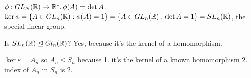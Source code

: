 \documentclass[class=article,crop=false]{standalone}
\begin{document}
\begin{eg}
	$ \phi : GL_N( \mathbb{R}) \to \mathbb{R}^*, \phi(A)= \det A $. $ \ker \phi= \{A \in GL_n( \mathbb{R}): \phi(A) = 1\} = \{A \in GL_n( \mathbb{R}): \det A = 1\} = SL_n( \mathbb{R})$, the special linear group. 

	Is $ SL_n( \mathbb{R}) \trianglelefteq Gl_n( \mathbb{R})$? Yes, because it's the kernel of a homomorphism.
\end{eg}

\begin{eg}
$ \ker \varepsilon = A_n$ so $ A_n \trianglelefteq S_n$ because 1. it's the kernel of a known homomorphism 2. index of $ A_n$ in $ S_n$ is 2.
\end{eg}
\end{document}
